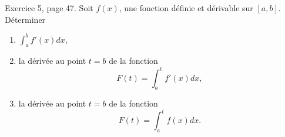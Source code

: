 \begin{exercice}\label{exoGeneral0020}

Exercice 5, page 47. Soit $f(x)$, une fonction définie et dérivable sur $[a,b]$. Déterminer
\begin{enumerate}

\item
$\int_a^bf'(x)dx$,

\item
la dérivée au point $t=b$ de la fonction
\begin{equation}
	F(t)=\int_a^tf'(x)dx,
\end{equation}

\item
la dérivée au point $t=b$ de la fonction
\begin{equation}
	F(t)=\int_a^tf(x)dx.
\end{equation}

\end{enumerate}


\end{exercice}

